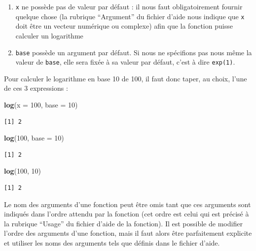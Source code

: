 \documentclass[a4paperpaper,]{article}
\newenvironment{Shaded}{\begin{snugshade}}{\end{snugshade}}
\newcommand{\KeywordTok}[1]{\textcolor[rgb]{0.13,0.29,0.53}{\textbf{#1}}}
\newcommand{\DataTypeTok}[1]{\textcolor[rgb]{0.13,0.29,0.53}{#1}}
\newcommand{\DecValTok}[1]{\textcolor[rgb]{0.00,0.00,0.81}{#1}}
\newcommand{\NormalTok}[1]{#1}
\providecommand{\tightlist}{%
  \setlength{\itemsep}{0pt}\setlength{\parskip}{0pt}}
\theoremstyle{definition}
\theoremstyle{definition}
\theoremstyle{definition}
\theoremstyle{remark}
\begin{document}
\begin{enumerate}
\def\labelenumi{\arabic{enumi}.}
\tightlist
\item
  \texttt{x} ne possède pas de valeur par défaut : il nous faut
  obligatoirement fournir quelque chose (la rubrique ``Argument'' du
  fichier d'aide nous indique que \texttt{x} doit être un vecteur
  numérique ou complexe) afin que la fonction puisse calculer un
  logarithme
\item
  \texttt{base} possède un argument par défaut. Si nous ne spécifions
  pas nous même la valeur de \texttt{base}, elle sera fixée à sa valeur
  par défaut, c'est à dire \texttt{exp(1)}.
\end{enumerate}

Pour calculer le logarithme en base 10 de 100, il faut donc taper, au
choix, l'une de ces 3 expressions :

\begin{Shaded}
\begin{Highlighting}[]
\KeywordTok{log}\NormalTok{(}\DataTypeTok{x =} \DecValTok{100}\NormalTok{, }\DataTypeTok{base =} \DecValTok{10}\NormalTok{)}
\end{Highlighting}
\end{Shaded}

\begin{verbatim}
[1] 2
\end{verbatim}

\begin{Shaded}
\begin{Highlighting}[]
\KeywordTok{log}\NormalTok{(}\DecValTok{100}\NormalTok{, }\DataTypeTok{base =} \DecValTok{10}\NormalTok{)}
\end{Highlighting}
\end{Shaded}

\begin{verbatim}
[1] 2
\end{verbatim}

\begin{Shaded}
\begin{Highlighting}[]
\KeywordTok{log}\NormalTok{(}\DecValTok{100}\NormalTok{, }\DecValTok{10}\NormalTok{)}
\end{Highlighting}
\end{Shaded}

\begin{verbatim}
[1] 2
\end{verbatim}

Le nom des arguments d'une fonction peut être omis tant que ces
arguments sont indiqués dans l'ordre attendu par la fonction (cet ordre
est celui qui est précisé à la rubrique ``Usage'' du fichier d'aide de
la fonction). Il est possible de modifier l'ordre des arguments d'une
fonction, mais il faut alors être parfaitement explicite et utiliser les
noms des arguments tels que définis dans le fichier d'aide.
\end{document}
